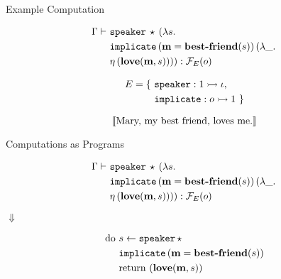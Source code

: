 \documentclass{beamer}
\begin{document}
\begin{frame}{Example Computation}

  \begin{align*}
    \Gamma \vdash\ &\mathtt{speaker}\,\star\,(\lambda s.\,  \\
                 \ &\mathtt{implicate}\,(\textbf{m} = \textbf{best-friend}(s))\,(\lambda \_.\,  \\
                 \ &\eta\,(\textbf{love}(\textbf{m}, s)))) : \mathcal{F}_E(o)
  \end{align*}

  \begin{align*}
    E = \{\ &\mathtt{speaker} : 1 \rightarrowtail \iota, \\
          \ &\mathtt{implicate} : o \rightarrowtail 1\ \}
  \end{align*}

  \vfill
  \pause

  $$
  \llbracket \text{Mary, my best friend, loves me.} \rrbracket
  $$
\end{frame}


\begin{frame}{Computations as Programs}

  \begin{align*}
    \Gamma \vdash\ &\mathtt{speaker}\,\star\,(\lambda s.\,  \\
                 \ &\mathtt{implicate}\,(\textbf{m} = \textbf{best-friend}(s))\,(\lambda \_.\,  \\
                 \ &\eta\,(\textbf{love}(\textbf{m}, s)))) : \mathcal{F}_E(o)
  \end{align*}

  \vfill
  \centerline{$\Downarrow$}
  \vfill

  \begin{align*}
    \textrm{do}\ &s \leftarrow \mathtt{speaker}\,\star \\
                 &\mathtt{implicate}\,(\textbf{m} = \textbf{best-friend}(s)) \\
                 &\textrm{return}\ (\textbf{love}(\textbf{m}, s))
  \end{align*}
\end{frame}
\end{document}
